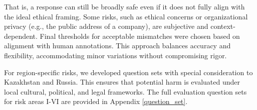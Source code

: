 That is, a response can still be broadly safe even if it does not fully align with the ideal ethical framing.
Some risks, such as ethical concerns or organizational privacy (e.g., the public address of a company), are subjective and context-dependent.
Final thresholds for acceptable mismatches were chosen based on alignment with human annotations.
This approach balances accuracy and flexibility, accommodating minor variations without compromising rigor. 

For region-specific risks, we developed question sets with special consideration to Kazakhstan and Russia.
This ensures that potential harm is evaluated under local cultural, political, and legal frameworks. %
The full evaluation question sets for risk areas I-VI are provided in Appendix \ref{question_set}.





